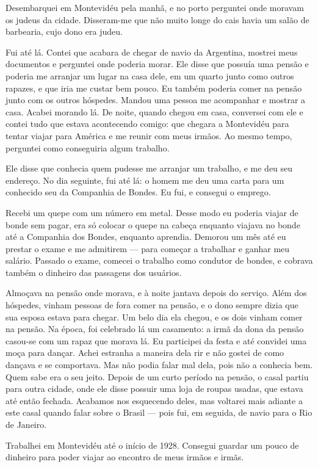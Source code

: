 Desembarquei em Montevidéu pela manhã, e no porto perguntei 
onde moravam os judeus da cidade. Disseram-me que não muito
longe do cais havia um salão de barbearia, cujo dono era judeu.

Fui até lá. Contei que acabara de chegar de navio da Argentina, mostrei
meus documentos e perguntei onde poderia morar. Ele disse que possuía
uma pensão e poderia me arranjar um lugar na casa dele, em um
quarto junto como outros rapazes, e que iria me custar bem pouco. Eu
 também poderia comer na pensão junto com os outros hóspedes. Mandou uma
pessoa me acompanhar e mostrar a casa. Acabei morando lá. De noite,
quando chegou em casa, conversei com ele e contei tudo que estava
acontecendo comigo: que chegara a Montevidéu para tentar
viajar para América e me reunir com meus irmãos. Ao mesmo tempo,
perguntei como conseguiria algum trabalho.

Ele disse que conhecia quem pudesse me arranjar um trabalho, e me deu seu
endereço. No dia seguinte, fui até lá: o homem me deu uma carta para um
conhecido seu da Companhia de Bondes. Eu fui, e consegui o emprego.

Recebi um quepe com um número em metal. Desse modo eu poderia viajar de
bonde sem pagar, era só colocar o quepe na cabeça enquanto viajava no
bonde até a Companhia dos Bondes, enquanto aprendia. Demorou um mês 
até eu prestar o exame e me admitirem --- para começar a trabalhar e ganhar 
meu salário. Passado o exame, comecei o trabalho 
como condutor de bondes, e cobrava também o dinheiro das passagens dos usuários.

Almoçava na pensão onde morava, e à noite jantava depois do serviço. Além dos hóspedes, 
vinham pessoas de fora comer na pensão, e o dono sempre
dizia que sua esposa estava para chegar. Um belo dia ela chegou, e os
dois vinham comer na pensão. Na época, foi celebrado lá um casamento: a irmã
da dona da pensão casou-se com um rapaz que morava lá. Eu participei da
festa e até convidei uma moça para dançar. Achei estranha a maneira dela 
rir e não gostei de como dançava e se comportava. Mas não podia
falar mal dela, pois não a conhecia bem. Quem sabe era o seu jeito.
Depois de um curto período na pensão, o casal partiu para outra cidade,
onde ele disse possuir uma loja de roupas usadas, que estava até então 
fechada. Acabamos nos esquecendo deles, mas voltarei mais adiante a este
casal quando falar sobre o Brasil --- pois fui, em seguida, de navio para o
Rio de Janeiro.

Trabalhei em Montevidéu até o início de 1928. Consegui guardar um pouco
de dinheiro para poder viajar ao encontro de meus irmãos e irmãs.

